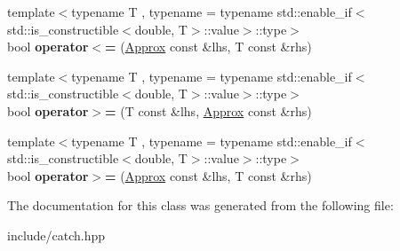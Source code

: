 \begin{DoxyCompactItemize}
\item 
{\footnotesize template$<$typename T , typename  = typename std\+::enable\+\_\+if$<$std\+::is\+\_\+constructible$<$double, T$>$\+::value$>$\+::type$>$ }\\bool {\bfseries operator$<$=} (\hyperlink{classCatch_1_1Detail_1_1Approx}{Approx} const \&lhs, T const \&rhs)\hypertarget{classCatch_1_1Detail_1_1Approx_a6040b908588745570847d7ae8483b091}{}\label{classCatch_1_1Detail_1_1Approx_a6040b908588745570847d7ae8483b091}

\item 
{\footnotesize template$<$typename T , typename  = typename std\+::enable\+\_\+if$<$std\+::is\+\_\+constructible$<$double, T$>$\+::value$>$\+::type$>$ }\\bool {\bfseries operator$>$=} (T const \&lhs, \hyperlink{classCatch_1_1Detail_1_1Approx}{Approx} const \&rhs)\hypertarget{classCatch_1_1Detail_1_1Approx_affd27efc62be386daeecb7a09e828d44}{}\label{classCatch_1_1Detail_1_1Approx_affd27efc62be386daeecb7a09e828d44}

\item 
{\footnotesize template$<$typename T , typename  = typename std\+::enable\+\_\+if$<$std\+::is\+\_\+constructible$<$double, T$>$\+::value$>$\+::type$>$ }\\bool {\bfseries operator$>$=} (\hyperlink{classCatch_1_1Detail_1_1Approx}{Approx} const \&lhs, T const \&rhs)\hypertarget{classCatch_1_1Detail_1_1Approx_a5899b8a36725406701e2ebded2971ee6}{}\label{classCatch_1_1Detail_1_1Approx_a5899b8a36725406701e2ebded2971ee6}

\end{DoxyCompactItemize}


The documentation for this class was generated from the following file\+:\begin{DoxyCompactItemize}
\item 
include/catch.\+hpp\end{DoxyCompactItemize}
